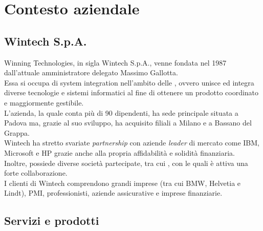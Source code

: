 \chapter{Contesto aziendale}
\label{cap:contestoAziendale}

\section{Wintech S.p.A.}
Winning Technologies, in sigla Wintech S.p.A., venne fondata nel 1987 dall'attuale amministratore delegato Massimo Gallotta.\\
Essa si occupa di \gls{system integration} nell'ambito delle , ovvero unisce ed integra diverse tecnologie e sistemi informatici al fine di ottenere un prodotto coordinato e maggiormente gestibile.\\
L'azienda, la quale conta più di 90 dipendenti, ha sede principale situata a Padova ma, grazie al suo sviluppo, ha acquisito filiali a Milano e a Bassano del Grappa.\\
Wintech ha stretto svariate \emph{partnership} con aziende \emph{leader} di mercato come IBM, Microsoft e HP grazie anche alla propria affidabilità e solidità finanziaria.\\ 
Inoltre, possiede diverse società partecipate, tra cui , con le quali è attiva una forte collaborazione.\\
I clienti di Wintech comprendono grandi imprese (tra cui BMW, Helvetia e Lindt), PMI, professionisti, aziende assicurative e imprese finanziarie. 

\section{Servizi e prodotti}
